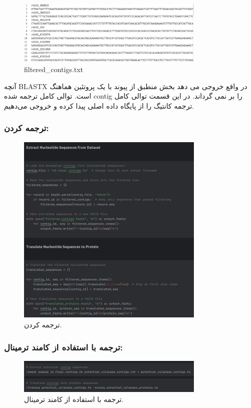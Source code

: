         \begin{figure}[H]
            \centering
            \includegraphics[width=0.8\textwidth]{images/filtered_contigs.jpg} %
            \caption{filtered\_contigs.txt}
            \label{fig:filtered_contigs}
        \end{figure}
        آنچه BLASTX در واقع خروجی می دهد بخش منطبق از پیوند با یک پروتئین هماهنگ است. توالی کامل ترجمه شده contig را بر نمی گرداند. در این قسمت توالی کامل ترجمه کانتیگ را از پایگاه داده اصلی پیدا کرده و خروجی می‌دهیم.

    \subsubsection*{ترجمه کردن:}
        \begin{figure}[H]
            \centering
            \includegraphics[width=0.8\textwidth]{images/step1_translate.jpg} %
            \caption{ترجمه کردن.}
            \label{fig:step1_translate}
        \end{figure}
    \subsubsection*{ترجمه با استفاده از کامند ترمینال:}
        \begin{figure}[H]
            \centering
            \includegraphics[width=0.8\textwidth]{images/step1_translate_terminal.jpg} %
            \caption{ترجمه با استفاده از کامند ترمینال.}
            \label{fig:step1_translate_terminal}
        \end{figure}
